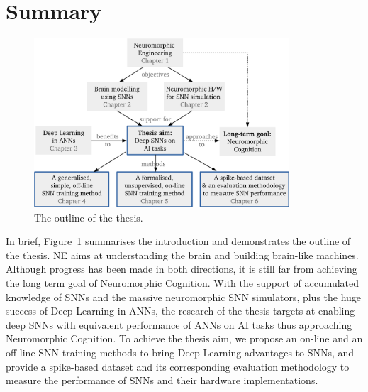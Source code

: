 \section{Summary}
	\begin{figure}[tbh!]
		\centering
		\includegraphics[width=0.85\textwidth]{pics_intro/intro_new.pdf}
		\caption{
			The outline of the thesis.
		}
		\label{fig:intro}
	\end{figure}
	
	In brief, Figure~\ref{fig:intro} summarises the introduction and demonstrates the outline of the thesis.
	NE aims at understanding the brain and building brain-like machines.
	Although progress has been made in both directions, it is still far from achieving the long term goal of Neuromorphic Cognition.
	With the support of accumulated knowledge of SNNs and the massive neuromorphic SNN simulators, plus the huge success of Deep Learning in ANNs, the research of the thesis targets at enabling deep SNNs with equivalent performance of ANNs on AI tasks thus approaching Neuromorphic Cognition.
	To achieve the thesis aim, we propose an on-line and an off-line SNN training methods to bring Deep Learning advantages to SNNs, and provide a spike-based dataset and its corresponding evaluation methodology to measure the performance of SNNs and their hardware implementations.
